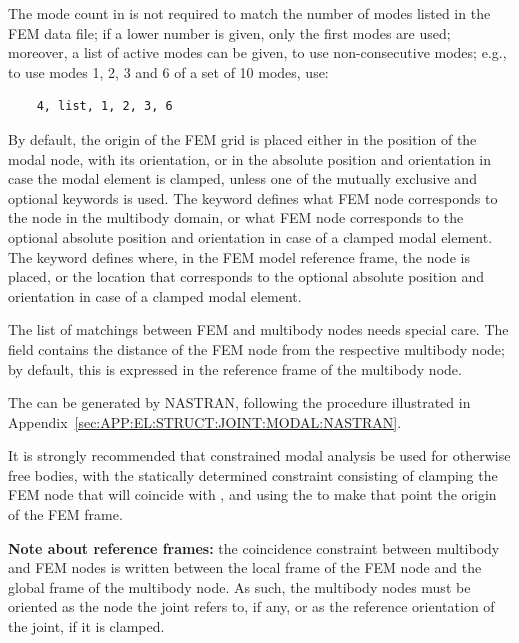 \noindent
The mode count in  is not required to match
the number of modes listed in the FEM data file; if a lower number
is given, only the first  modes are used;
moreover, a list of active modes can be given, to use non-consecutive
modes; e.g., to use modes 1, 2, 3 and 6 of a set of 10 modes, use:
\begin{verbatim}
	4, list, 1, 2, 3, 6
\end{verbatim}

\noindent
By default, the origin of the FEM grid is placed either in the position
of the modal node, with its orientation, or in the absolute position 
and orientation in case the modal element is clamped, 
unless one of the mutually exclusive  
and  optional keywords is used.
The  keyword defines what FEM node corresponds 
to the  node in the multibody domain,
or what FEM node corresponds to the optional absolute position 
and orientation in case of a clamped modal element.
The  keyword defines where, in the FEM model
reference frame, the  node is placed, or the location
that corresponds to the optional absolute position and orientation
in case of a clamped modal element.

\noindent
The list of matchings between FEM and multibody nodes needs
special care.
The  field contains the distance
of the FEM node from the respective multibody node; by default,
this is expressed in the reference frame of the multibody node.

\noindent
The  can be generated by NASTRAN, 
following the procedure illustrated
in Appendix~\ref{sec:APP:EL:STRUCT:JOINT:MODAL:NASTRAN}.

\noindent
It is strongly recommended that constrained modal analysis
be used for otherwise free bodies, with the statically 
determined constraint consisting of clamping the FEM node 
that will coincide with , and using
the  to make that point the origin of the FEM frame.

\noindent
\textbf{Note about reference frames:} the coincidence constraint between 
multibody and FEM nodes is written between the local frame 
of the FEM node and the global frame of the multibody node.
As such, the multibody nodes must be oriented as the 
node the  joint refers to, if any, or as the reference
orientation of the  joint, if it is clamped.

